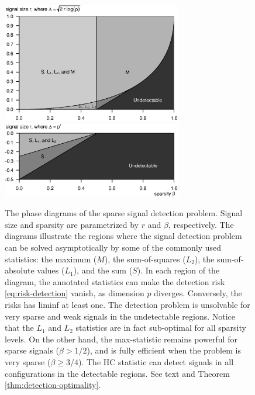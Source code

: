 \begin{figure}
      \centering
      \includegraphics[width=0.7\textwidth]{figures/phase_diagram_signal_detection.eps}
      \includegraphics[width=0.7\textwidth]{figures/phase_diagram_signal_detection_vanishing_signals.eps}
      \caption{The phase diagrams of the sparse signal detection problem. 
      Signal size and sparsity are parametrized by $r$ and $\beta$, respectively.
      The diagrams illustrate the regions where the signal detection problem can be solved asymptotically by some of the commonly used statistics: the maximum ($M$), the sum-of-squares ($L_2$), the sum-of-absolute values ($L_1$), and the sum ($S$).
      In each region of the diagram, the annotated statistics can make the detection risk \eqref{eq:risk-detection} vanish, as dimension $p$ diverges. Conversely, the risks has liminf at least one.
      The detection problem is unsolvable for very sparse and weak signals in the undetectable regions.
      Notice that the $L_1$ and $L_2$ statistics are in fact sub-optimal for all sparsity levels.
      On the other hand, the max-statistic remains powerful for sparse signals ($\beta>1/2$), and is fully efficient when the problem is very sparse ($\beta\ge3/4$).
      The \ac{HC} statistic can detect signals in all configurations in the detectable regions.
      See text and Theorem \ref{thm:detection-optimality}.}
      \label{fig:phase-diagram-signal-detection}
\end{figure}


